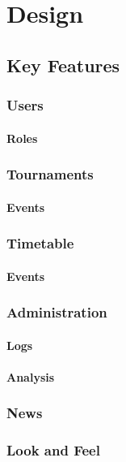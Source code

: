 \chapter{Design}
\label{design}

\section{Key Features}

\subsection{Users}

\subsubsection{Roles}

\subsection{Tournaments}

\subsubsection{Events}

\subsection{Timetable}

\subsubsection{Events}

\subsection{Administration}

\subsubsection{Logs}

\subsubsection{Analysis}

\subsection{News}

\subsection{Look and Feel}